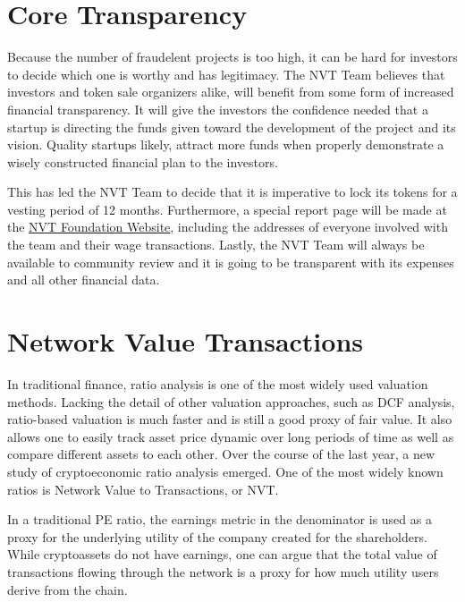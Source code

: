 \section{Core Transparency}

Because the number of fraudelent projects is too high, it can be hard for investors to decide which one is worthy and has legitimacy. The NVT Team believes that investors and token sale organizers alike, will benefit from some form of increased financial transparency. It will give the investors the confidence needed that a startup is directing the funds given toward the development of the project and its vision. Quality startups likely, attract more funds when properly demonstrate a wisely constructed financial plan to the investors.

This has led the NVT Team to decide that it is imperative to lock its tokens for a vesting period of 12 months. Furthermore, a special report page will be made at the \href{https://nvtnetwork.com/}{NVT Foundation Website}, including the addresses of everyone involved with the team and their wage transactions. Lastly, the NVT Team will always be available to community review and it is going to be transparent with its expenses and all other financial data.


\section{Network Value Transactions}

In traditional finance, ratio analysis is one of the most widely used valuation methods. Lacking the detail of other valuation approaches, such as DCF analysis, ratio-based valuation is much faster and is still a good proxy of fair value. It also allows one to easily track asset price dynamic over long periods of time as well as compare different assets to each other. Over the course of the last year, a new study of cryptoeconomic ratio analysis emerged. One of the most widely known ratios is Network Value to Transactions, or NVT.

In a traditional PE ratio, the earnings metric in the denominator is used as a proxy for the underlying utility of the company created for the shareholders. While cryptoassets do not have earnings, one can argue that the total value of transactions flowing through the network is a proxy for how much utility users derive from the chain.

